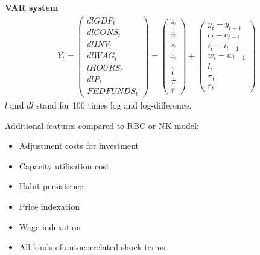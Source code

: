 \documentclass{beamer}
\begin{document}
\begin{frame}
 \textbf{VAR system}
\begin{align}
  Y_t = \begin{pmatrix}
    dlGDP_t \\ dlCONS_t \\ dlINV_t \\ dlWAG_t \\ lHOURS_t \\ dlP_t \\ FEDFUNDS_t
  \end{pmatrix} =
  \begin{pmatrix}
    \overline{\gamma} \\ \overline{\gamma} \\ \overline{\gamma} \\ \overline{\gamma} \\ \overline{l} \\ \overline{\pi} \\ \overline{r}
  \end{pmatrix} +
  \begin{pmatrix}
    y_t-y_{t-1} \\c_t-c_{t-1} \\ i_t-i_{t-1} \\ w_t-w_{t-1} \\ l_t \\ \pi_t \\ r_t
  \end{pmatrix}  
\end{align}
\medskip
  $l$ and $dl$ stand for 100 times log and log-difference.  
\end{frame}

\begin{frame}
  Additional features compared to RBC or NK model:  
\begin{itemize}
  \item Adjustment costs for investment
  \item Capacity utilisation cost
  \item Habit persistence
  \item Price indexation
  \item Wage indexation
  \item All kinds of autocorrelated shock terms
\end{itemize}
\end{frame}
\end{document}
